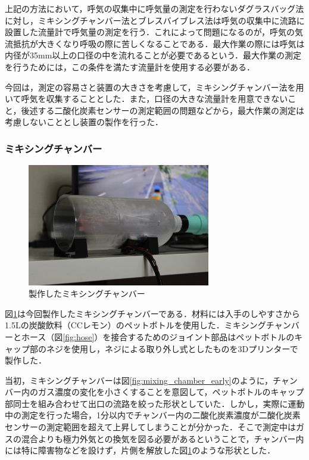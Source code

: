 上記の方法において，呼気の収集中に呼気量の測定を行わないダグラスバッグ法に対し，ミキシングチャンバー法とブレスバイブレス法は呼気の収集中に流路に設置した流量計で呼気量の測定を行う．これによって問題になるのが，呼気の気流抵抗が大きくなり呼吸の際に苦しくなることである．最大作業の際には呼気は内径が35mm以上の口径の中を流れることが必要であるという\cite{science_of_vo2}．最大作業の測定を行うためには，この条件を満たす流量計を使用する必要がある．

今回は，測定の容易さと装置の大きさを考慮して，ミキシングチャンバー法を用いて呼気を収集することとした．また，口径の大きな流量計を用意できないこと，後述する二酸化炭素センサーの測定範囲の問題などから，最大作業の測定は考慮しないこととし装置の製作を行った．

\subsubsection{ミキシングチャンバー}

\begin{figure}[H]
  \begin{center}
    \includegraphics[width=8cm]{fig/mixing_chamber}
    \caption{製作したミキシングチャンバー}
    \label{fig:mixing_chamber}
  \end{center}
\end{figure}

図\ref{fig:mixing_chamber}は今回製作したミキシングチャンバーである．材料には入手のしやすさから1.5Lの炭酸飲料（CCレモン）のペットボトルを使用した．ミキシングチャンバーとホース（図\ref{fig:hose}）を接合するためのジョイント部品はペットボトルのキャップ部のネジを使用し，ネジによる取り外し式としたものを3Dプリンターで製作した．

当初，ミキシングチャンバーは図\ref{fig:mixing_chamber_early}のように，チャンバー内のガス濃度の変化を小さくすることを意図して，ペットボトルのキャップ部同士を組み合わせて出口の流路を絞った形状としていた．しかし，実際に運動中の測定を行った場合，1分以内でチャンバー内の二酸化炭素濃度が二酸化炭素センサーの測定範囲を超えて上昇してしまうことが分かった．そこで測定中はガスの混合よりも極力外気との換気を図る必要があるということで，チャンバー内には特に障害物などを設けず，片側を解放した図\ref{fig:mixing_chamber}のような形状とした．

